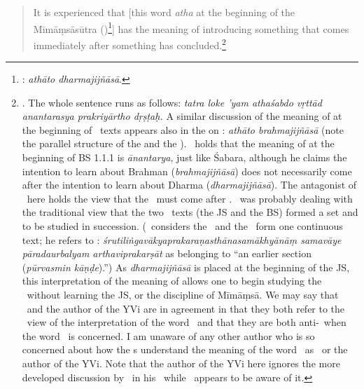\begin{quote}
  It is experienced that [this word \emph{atha\/} at the
  beginning of the Mī\-māṃ\-sā\-sū\-tra (\JS)\footnote{: \emph{athāto dharmajijñāsā}.}] has the meaning of introducing something
  that comes immediately after something has concluded.\footnote{.  The
    whole sentence runs as follows: \emph{tatra loke 'yam athaśabdo
      vṛttād a\-na\-nta\-ra\-sya prakriyārtho dṛṣṭaḥ\dd.} A similar discussion
    of the meaning of \atha{} at the beginning of \sutra\ texts
    appears also in the  on : \emph{athāto brahmajijñāsā} (note the parallel structure of the  and the ).  \Sankara\ holds that the meaning of \atha{} at the beginning of BS 1.1.1 is \emph{ānantarya}, just like Śabara, although he claims the intention to learn about Brahman (\emph{brahmajijñāsā}) does not necessarily come after the intention to learn about Dharma (\emph{dharmajijñāsā}).  The antagonist of \Sankara\ here holds the view that the \brahmajijnasa\ must come after \dharmajijnasa.  \Sankara\ was probably dealing with the traditional view that the two \sutra\ texts (the JS and the BS) formed a set and to be studied in succession.  (\Sankara\ considers the \JS\ and the \BS\ form one continuous text; he refers to : \emph{śruti\-liṅga\-vākya\-prakaraṇa\-sthāna\-samākhyā\-nāṃ sama\-vā\-ye pāra\-daurbalyam artha\-vi\-pra\-karṣāt} as belonging to ``an earlier section (\emph{pūrvasmin kāṇḍe}).'') As \emph{dharmajijñāsā} is placed at the beginning of the JS, this interpretation of the meaning of \atha{} allows one to begin studying the \BS\ without learning the JS, or the discipline of Mīmāṃsā.  We may say that \Sankara\ and the author of the YVi are in agreement in that they both refer to the \Mimamsaka\ view of the interpretation of the word \atha\ and that they are both anti-\Mimamsaka\ when the word \atha\ is concerned.  I am unaware of any other author who is so concerned about how the \Mimamsaka s understand the meaning of the word \atha\ as \Sankara\ or the author of the YVi.  Note that the author of the YVi here ignores the more developed discussion by \Kumarila\ in his \SV\ while \Sankara\ appears to be aware of it.}
\end{quote}

